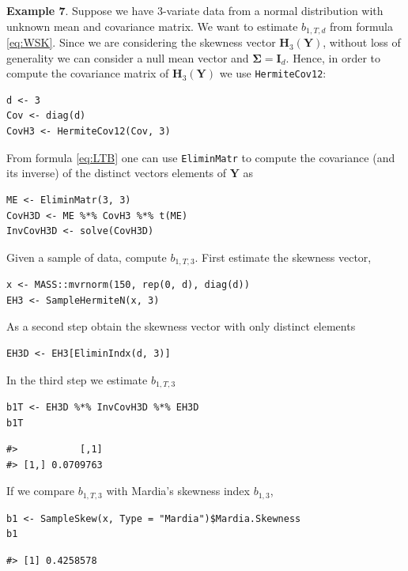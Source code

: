 \textbf{Example 7}. Suppose we have \(3\)-variate data from a normal distribution with unknown mean and covariance matrix. We want to estimate \(b_{1,T,d}\) from formula \eqref{eq:WSK}. Since we are considering the skewness vector \(\mathbf{H}_3(\mathbf{Y})\), without loss of generality we can consider a null mean vector and \(\boldsymbol{\Sigma}= \mathbf{I}_d\). Hence, in order to compute the covariance matrix of \(\mathbf{H}_3(\mathbf{Y})\) we use \texttt{HermiteCov12}:

\begin{verbatim}
d <- 3
Cov <- diag(d)
CovH3 <- HermiteCov12(Cov, 3)
\end{verbatim}

From formula \eqref{eq:LTB} one can use \texttt{EliminMatr} to compute the covariance (and its inverse) of the distinct vectors elements of \(\mathbf{Y}\) as

\begin{verbatim}
ME <- EliminMatr(3, 3)
CovH3D <- ME %*% CovH3 %*% t(ME)
InvCovH3D <- solve(CovH3D)
\end{verbatim}

Given a sample of data, compute \(b_{1,T,3}\). First estimate the skewness vector,

\begin{verbatim}
x <- MASS::mvrnorm(150, rep(0, d), diag(d))
EH3 <- SampleHermiteN(x, 3)
\end{verbatim}

As a second step obtain the skewness vector with only distinct elements

\begin{verbatim}
EH3D <- EH3[EliminIndx(d, 3)]
\end{verbatim}

In the third step we estimate \(b_{1,T,3}\)

\begin{verbatim}
b1T <- EH3D %*% InvCovH3D %*% EH3D
b1T
\end{verbatim}

\begin{verbatim}
#>           [,1]
#> [1,] 0.0709763
\end{verbatim}

If we compare \(b_{1,T,3}\) with Mardia's skewness index \(b_{1,3}\),

\begin{verbatim}
b1 <- SampleSkew(x, Type = "Mardia")$Mardia.Skewness
b1
\end{verbatim}

\begin{verbatim}
#> [1] 0.4258578
\end{verbatim}

